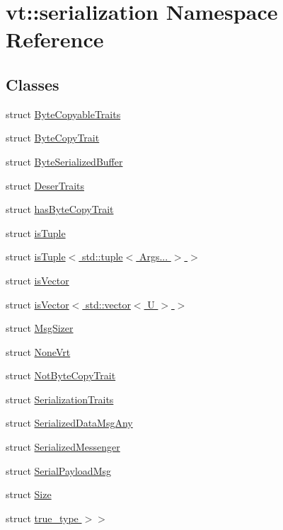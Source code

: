 \hypertarget{namespacevt_1_1serialization}{}\section{vt\+:\+:serialization Namespace Reference}
\label{namespacevt_1_1serialization}
\subsection*{Classes}
\begin{DoxyCompactItemize}
\item 
struct \hyperlink{structvt_1_1serialization_1_1_byte_copyable_traits}{Byte\+Copyable\+Traits}
\item 
struct \hyperlink{structvt_1_1serialization_1_1_byte_copy_trait}{Byte\+Copy\+Trait}
\item 
struct \hyperlink{structvt_1_1serialization_1_1_byte_serialized_buffer}{Byte\+Serialized\+Buffer}
\item 
struct \hyperlink{structvt_1_1serialization_1_1_deser_traits}{Deser\+Traits}
\item 
struct \hyperlink{structvt_1_1serialization_1_1has_byte_copy_trait}{has\+Byte\+Copy\+Trait}
\item 
struct \hyperlink{structvt_1_1serialization_1_1is_tuple}{is\+Tuple}
\item 
struct \hyperlink{structvt_1_1serialization_1_1is_tuple_3_01std_1_1tuple_3_01_args_8_8_8_01_4_01_4}{is\+Tuple$<$ std\+::tuple$<$ Args... $>$ $>$}
\item 
struct \hyperlink{structvt_1_1serialization_1_1is_vector}{is\+Vector}
\item 
struct \hyperlink{structvt_1_1serialization_1_1is_vector_3_01std_1_1vector_3_01_u_01_4_01_4}{is\+Vector$<$ std\+::vector$<$ U $>$ $>$}
\item 
struct \hyperlink{structvt_1_1serialization_1_1_msg_sizer}{Msg\+Sizer}
\item 
struct \hyperlink{structvt_1_1serialization_1_1_none_vrt}{None\+Vrt}
\item 
struct \hyperlink{structvt_1_1serialization_1_1_not_byte_copy_trait}{Not\+Byte\+Copy\+Trait}
\item 
struct \hyperlink{structvt_1_1serialization_1_1_serialization_traits}{Serialization\+Traits}
\item 
struct \hyperlink{structvt_1_1serialization_1_1_serialized_data_msg_any}{Serialized\+Data\+Msg\+Any}
\item 
struct \hyperlink{structvt_1_1serialization_1_1_serialized_messenger}{Serialized\+Messenger}
\item 
struct \hyperlink{structvt_1_1serialization_1_1_serial_payload_msg}{Serial\+Payload\+Msg}
\item 
struct \hyperlink{structvt_1_1serialization_1_1_size}{Size}
\item 
struct \hyperlink{structvt_1_1serialization_1_1_size_3_01_msg_t_00_01typename_01std_1_1enable__if__t_3_01std_1_1true__type_01_4_4}{true\+\_\+type $>$$>$}
\end{DoxyCompactItemize}
